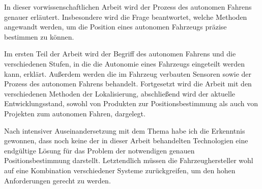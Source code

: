 
In dieser vorwissenschaftlichen Arbeit wird der Prozess des autonomen Fahrens genauer erläutert. Insbesondere wird die Frage beantwortet, welche Methoden angewandt werden, um die Position eines autonomen Fahrzeugs präzise bestimmen zu können.
\bigskip

Im ersten Teil der Arbeit wird der Begriff des autonomen Fahrens und die verschiedenen Stufen, in die die Autonomie eines Fahrzeugs eingeteilt werden kann, erklärt. Außerdem werden die im Fahrzeug verbauten Sensoren sowie der Prozess des autonomen Fahrens behandelt. Fortgesetzt wird die Arbeit mit den verschiedenen Methoden der Lokalisierung, abschließend wird der aktuelle Entwicklungsstand, sowohl von Produkten zur Positionsbestimmung als auch von Projekten zum autonomen Fahren, dargelegt.
\bigskip

Nach intensiver Auseinandersetzung mit dem Thema habe ich die Erkenntnis gewonnen, dass noch keine der in dieser Arbeit behandelten Technologien eine endgültige Lösung für das Problem der notwendigen genauen Positionsbestimmung darstellt. Letztendlich müssen die Fahrzeughersteller wohl auf eine Kombination verschiedener Systeme zurückgreifen, um den hohen Anforderungen gerecht zu werden.
